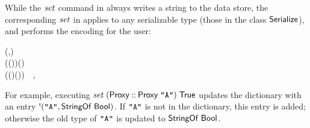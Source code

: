 While the \ensuremath{\Varid{set}} command in \Hedis{} always writes a string to the data store,
the corresponding \ensuremath{\Varid{set}} in \Redis{} applies to any serializable type (those
in the class \ensuremath{\Conid{Serialize}}), and performs the encoding for the user:
\begin{hscode}\SaveRestoreHook
{}%
%
%
\>[B]{}\<[6]%
\>[6]{}\mathbin{::}(\;,\;){}\<[E]%
\\
\>[6]{}\Rightarrow {}\;\to {}\to {}\;\;(\;\;\;(\;))\;(\;\;){}\<[E]%
\\
\>[B]{}\;\;\mathrel{=}\;(\;(\;)\;(\;))~~,{}\<[E]%
\ColumnHook
\end{hscode}\resethooks
For example, executing \ensuremath{\Varid{set}\;(\Conid{Proxy}\mathbin{::}\Conid{Proxy}\;\text{\tt \char34 A\char34})\;\Conid{True}} updates the dictionary
with an entry \ensuremath{\mbox{\textquotesingle}(\text{\tt \char34 A\char34},\Conid{StringOf}\;\Conid{Bool})}. If \ensuremath{\text{\tt \char34 A\char34}} is not in the dictionary,
this entry is added; otherwise the old type of \ensuremath{\text{\tt \char34 A\char34}} is updated to
\ensuremath{\Conid{StringOf}\;\Conid{Bool}}.

